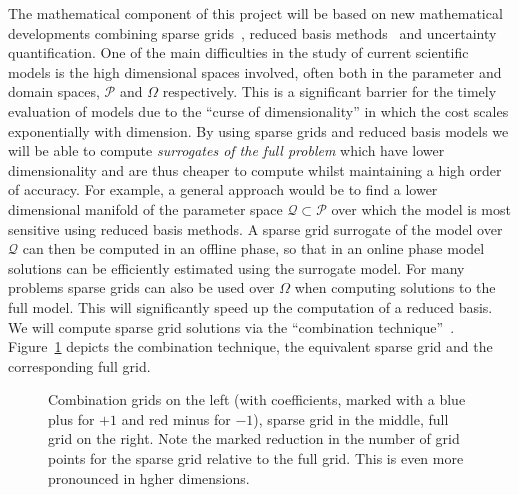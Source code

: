 \documentclass[a4paper,fontsize=12pt]{scrartcl}
\begin{document}
The mathematical component of this project will be based on new
mathematical developments combining sparse grids~\parencite{BungartzGriebel2004}, 
reduced basis methods~\parencite{LiebermanEtal2010,Peherstorfer2013,ChenSchwab2015}
and uncertainty quantification. 
One of the main difficulties in the study of current scientific models is
the high dimensional spaces involved, often both in the parameter and
domain spaces, $\mathcal{P}$ and $\Omega$ respectively. 
This is a significant barrier for the timely evaluation of models due to the 
``curse of dimensionality'' in which the cost scales exponentially with dimension.
By using sparse grids and reduced basis models we will be able to compute
{\em surrogates of the full problem} which have lower dimensionality and are thus cheaper  
to compute whilst maintaining a high order of accuracy.
For example, a general approach would be to find a lower dimensional manifold 
of the parameter space $\mathcal{Q}\subset\mathcal{P}$ over which the 
model is most sensitive using reduced basis methods.
A sparse grid surrogate of the model over $\mathcal{Q}$ can then be 
computed in an offline phase, so that in an online phase model solutions
can be efficiently estimated using the surrogate model.
For many problems sparse grids can also be used over $\Omega$ when  
computing solutions to the full model. 
This will significantly speed up the computation of a reduced basis.
We will compute sparse grid solutions via the
``combination technique''~\parencite{Griebel1990}. 
Figure~\ref{fig:sparse_grids} depicts the combination technique, the
equivalent sparse grid and the corresponding full grid. 

\begin{figure}
  \centering
    
  \caption{Combination grids on the left (with coefficients, marked with
    a blue plus for $+1$ and red minus for $-1$), sparse grid in the
    middle, full grid on the right. Note the marked reduction in the number of 
    grid points for the sparse grid relative to the full grid. 
   This is even more pronounced in hgher dimensions.}
  \label{fig:sparse_grids}
\end{figure}
\end{document}
